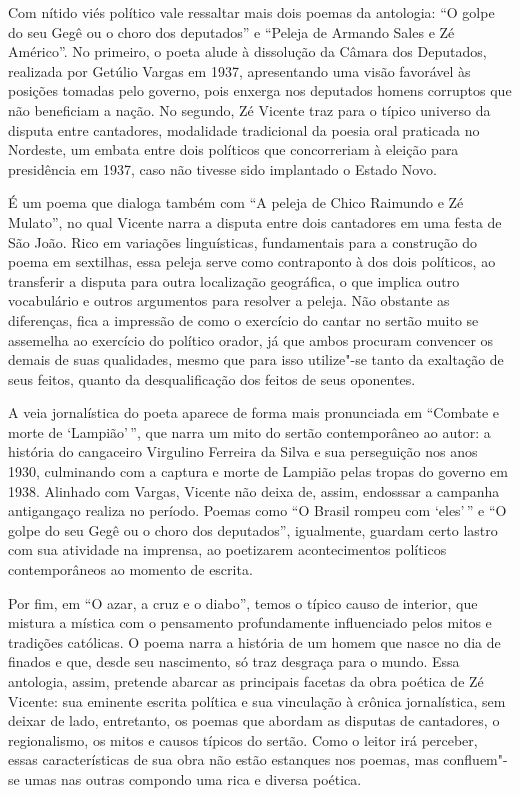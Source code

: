 Com nítido viés político vale ressaltar mais dois poemas da antologia:
``O golpe do seu Gegê ou o choro dos deputados'' e ``Peleja de Armando Sales e Zé Américo''.
No primeiro, o poeta alude à dissolução da Câmara dos Deputados, realizada por Getúlio Vargas em 1937, apresentando uma visão favorável às posições tomadas pelo governo, pois enxerga nos deputados homens corruptos que não beneficiam a nação.
No segundo, Zé Vicente traz para o típico universo da disputa entre cantadores, modalidade tradicional da poesia oral praticada no Nordeste, um embata entre dois políticos que concorreriam à eleição para presidência em 1937, caso não tivesse sido implantado o Estado Novo.

É um poema que dialoga também com ``A peleja de Chico Raimundo e Zé
Mulato'', no qual Vicente narra a disputa entre dois cantadores em uma festa de São João.
Rico em variações linguísticas, fundamentais para a construção do poema em sextilhas,
essa peleja serve como contraponto à dos dois políticos, ao transferir a disputa para outra localização geográfica, o que implica outro vocabulário e outros argumentos para resolver a peleja. Não obstante as diferenças, fica a impressão de como o exercício do cantar no sertão muito se assemelha ao exercício do político orador, já que ambos procuram convencer os demais de suas qualidades, mesmo que para isso utilize"-se tanto da
exaltação de seus feitos, quanto da desqualificação dos feitos de 
seus oponentes. 

A veia jornalística do poeta aparece de forma mais pronunciada em ``Combate e morte de
`Lampião'\,'', que narra um mito do sertão contemporâneo ao autor: a história do cangaceiro Virgulino Ferreira da Silva e sua perseguição nos anos 1930, culminando com a captura e morte de Lampião pelas tropas do governo em 1938. Alinhado com Vargas, Vicente não deixa de, assim, endosssar a campanha antigangaço realiza no período. Poemas como ``O Brasil rompeu com `eles'\,'' e ``O golpe do seu Gegê ou o choro dos deputados'', igualmente, guardam certo lastro com sua atividade na imprensa, ao poetizarem acontecimentos políticos contemporâneos ao momento de escrita.

Por fim, em ``O azar, a cruz e o diabo'', temos o típico causo de interior, que mistura a mística com o pensamento profundamente influenciado pelos mitos e tradições católicas. O poema narra a história de um homem que nasce no dia de finados e que, desde seu
nascimento, só traz desgraça para o mundo. Essa antologia, assim, pretende abarcar as principais facetas da obra poética de Zé Vicente: sua eminente escrita política e sua vinculação à crônica jornalística, sem deixar de lado, entretanto, os poemas que abordam as disputas de cantadores, o regionalismo, os mitos e causos típicos do sertão. Como o leitor irá perceber, essas características de sua obra não estão estanques nos poemas, mas confluem"-se umas nas outras compondo uma rica e diversa poética.


